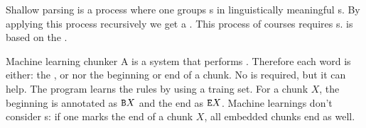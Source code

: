\begin{df}[Chunking]{Shallow parsing}
\sb{} is a process where one groups s in linguistically meaningful s. By applying this process recursively we get a . This process of courses requires s. \sb{} is based on the .
\end{df}
\begin{df}{Machine learning chunker}
A \sb{} is a system that performs . Therefore each word is either: the ,  or nor the beginning or end of a chunk. No  is required, but it can help. The program learns the rules by using a traing set. For a chunk $X$, the beginning is annotated as $\mbox{\texttt{B}}X$ and the end as $\mbox{\texttt{E}}X$. Machine learnings don't consider s: if one marks the end of a chunk $X$, all embedded chunks end as well.
\end{df}